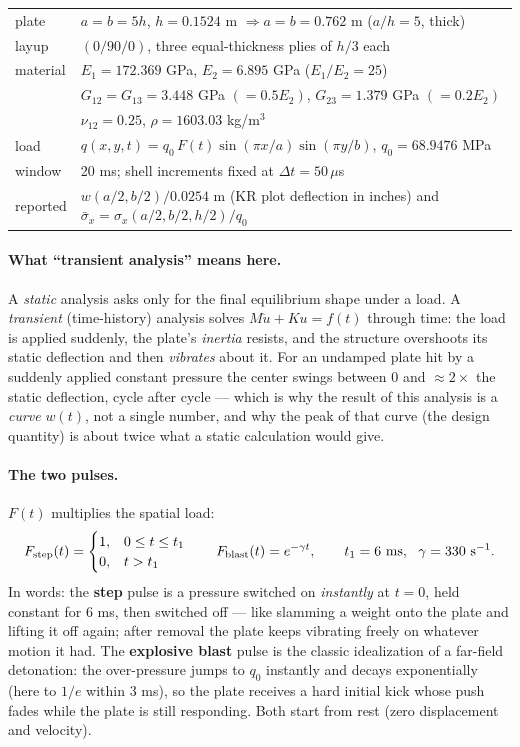 \documentclass[11pt]{article}
\begin{document}
\begin{center}\begin{tabular}{ll}\toprule
plate & $a=b=5h$, $h=0.1524$ m $\Rightarrow a=b=0.762$ m ($a/h=5$, thick)\\
layup & $(0/90/0)$, three equal-thickness plies of $h/3$ each\\
material & $E_1=172.369$ GPa, $E_2=6.895$ GPa ($E_1/E_2=25$)\\
 & $G_{12}=G_{13}=3.448$ GPa $(=0.5E_2)$, $G_{23}=1.379$ GPa $(=0.2E_2)$\\
 & $\nu_{12}=0.25$, $\rho=1603.03$ kg/m$^3$\\
load & $q(x,y,t)=q_0\,F(t)\sin(\pi x/a)\sin(\pi y/b)$, $q_0=68.9476$ MPa\\
window & 20 ms; shell increments fixed at $\Delta t=50\,\mu$s\\
reported & $w(a/2,b/2)/0.0254$ m (KR plot deflection in inches) and
$\bar\sigma_x=\sigma_x(a/2,b/2,h/2)/q_0$\\
\bottomrule\end{tabular}\end{center}

\paragraph{What ``transient analysis'' means here.}
A \emph{static} analysis asks only for the final equilibrium shape under a
load.  A \emph{transient} (time-history) analysis solves
$M\ddot u+Ku=f(t)$ through time: the load is applied suddenly, the plate's
\emph{inertia} resists, and the structure overshoots its static deflection
and then \emph{vibrates} about it.  For an undamped plate hit by a
suddenly applied constant pressure the center swings between $0$ and
$\approx2\times$ the static deflection, cycle after cycle --- which is why
the result of this analysis is a \emph{curve} $w(t)$, not a single number,
and why the peak of that curve (the design quantity) is about twice what a
static calculation would give.

\paragraph{The two pulses.}  $F(t)$ multiplies the spatial load:
\begin{equation}
F_{\rm step}(t)=\begin{cases}1,&0\le t\le t_1\\ 0,&t>t_1\end{cases}
\qquad
F_{\rm blast}(t)=e^{-\gamma t},
\qquad t_1=6\ {\rm ms},\ \ \gamma=330\ {\rm s}^{-1}.
\end{equation}
In words: the \textbf{step} pulse is a pressure switched on
\emph{instantly} at $t=0$, held constant for 6 ms, then switched off ---
like slamming a weight onto the plate and lifting it off again; after
removal the plate keeps vibrating freely on whatever motion it had.  The
\textbf{explosive blast} pulse is the classic idealization of a far-field
detonation: the over-pressure jumps to $q_0$ instantly and decays
exponentially (here to $1/e$ within 3 ms), so the plate receives a hard
initial kick whose push fades while the plate is still responding.  Both
start from rest (zero displacement and velocity).
\end{document}
